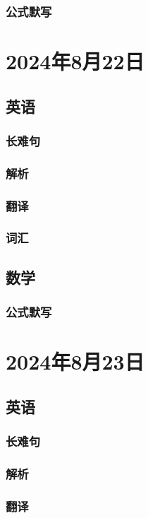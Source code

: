\documentclass[UTF8]{ctexart}
\begin{document}
\subsubsection{公式默写}
\begin{multicols}{2}
\end{multicols}
\section{2024年8月22日}
\subsection{英语}
\subsubsection{长难句}
\subsubsection{解析}
\subsubsection{翻译}
\subsubsection{词汇}
\subsection{数学}
\subsubsection{公式默写}
\begin{multicols}{2}
\end{multicols}
\section{2024年8月23日}
\subsection{英语}
\subsubsection{长难句}
\subsubsection{解析}
\subsubsection{翻译}
\end{document}
